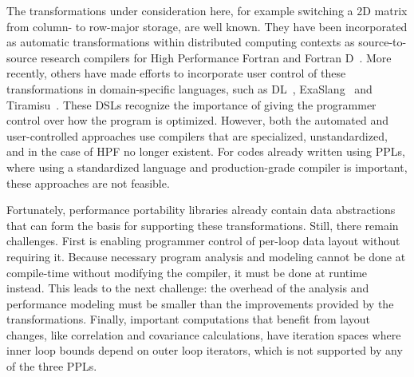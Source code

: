 The transformations under consideration here, for example switching a 2D matrix from column- to row-major storage, are well known.
They have been incorporated as automatic transformations within distributed computing contexts as source-to-source research compilers for High Performance Fortran and Fortran D~\cite{bixby1994automatic,kennedy1995automatic,kennedy1998automatic}.
More recently, others have made efforts to incorporate user control of these transformations in domain-specific languages, such as DL~\cite{sung2012dl}, ExaSlang~\cite{kronawitter2018automatic} and Tiramisu~\cite{baghdadi2019tiramisu}.
These DSLs recognize the importance of giving the programmer control over how the program is optimized. %
However, both the automated and user-controlled approaches use compilers that are specialized, unstandardized, and in the case of HPF no longer existent.
For codes already written using PPLs, where using a standardized language and production-grade compiler is important, these approaches are not feasible.

Fortunately, performance portability libraries already contain data abstractions that can form the basis for supporting these transformations.
Still, there remain challenges.
First is enabling programmer control of per-loop data layout without requiring it.
Because necessary program analysis and modeling cannot be done at compile-time without modifying the compiler, it must be done at runtime instead.
This leads to the next challenge: the overhead of the analysis and performance modeling must be smaller than the improvements provided by the transformations.
Finally, important computations that benefit from layout changes, like correlation and covariance calculations, have iteration spaces where inner loop bounds depend on outer loop iterators, which is not supported by any of the three PPLs.  %

